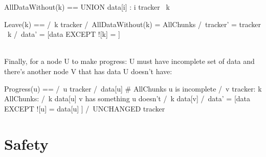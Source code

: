 \begin{tla}
AllDataWithout(k) == 
    UNION {data[i] : i \in tracker \ {k}}

Leave(k) == 
    /\ k \in tracker
    /\ AllDataWithout(k) = AllChunks
    /\ tracker' = tracker \ {k}
    /\ data' = [data EXCEPT ![k] = {}] 
\end{tla}
\begin{tlatex}
%
\@pvspace{8.0pt}%
%
%
%
\end{tlatex}
\\

Finally, for a node U to make progress: U must have incomplete set of data and
there's another node V that has data U doesn't have:\\

\begin{tla}
Progress(u) == 
    /\ u \in tracker
    /\ data[u] # AllChunks  \* u is incomplete
    /\ \E v \in tracker:
        \E k \in AllChunks:
            /\ k \notin data[u]     \* v has something u doesn't
            /\ k \in data[v] 
            /\ data' = [data EXCEPT ![u] = data[u] ]
            /\ UNCHANGED tracker
\end{tla}
\begin{tlatex}
%
%
%
%
\@xx{}%
%
%
%
%
\@xx{}%
%
%
\end{tlatex}

\section{Safety}

